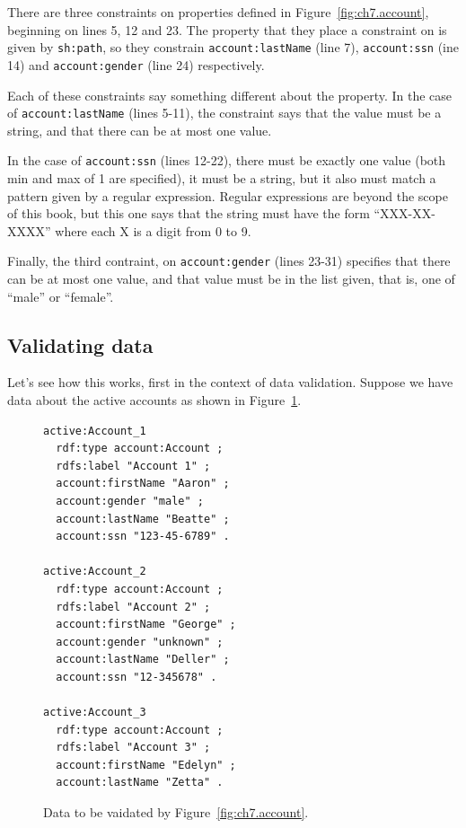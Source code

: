 There are three constraints on properties defined in Figure~\ref{fig:ch7.account}, beginning on lines 5, 12 and 23.  The property that they place a constraint on is given by \texttt{sh:path}, so they constrain \texttt{account:lastName} (line 7), \texttt{account:ssn} (ine 14)  and \texttt{account:gender} (line 24) respectively.

Each of these constraints say something different about the property.  
In the case of \texttt{account:lastName} (lines 5-11), the constraint says 
that the value must be a string,  and that there can be at most one value.

In the case of \texttt{account:ssn} (lines 12-22), there must be exactly one value 
(both min and max of 1 are specified), it must be a string, but it also must match
a pattern given by a regular expression.  Regular expressions are beyond the scope
of this book, but this one says that the string must have the form ``XXX-XX-XXXX''
where each X is a digit from 0 to 9.

Finally, the third contraint, on \texttt{account:gender} (lines 23-31) specifies that
there can be at most one value, and that value must be in the list given, that is, one
of ``male'' or ``female''.

\hypertarget{validating-data}{%
\subsection{Validating data}\label{validating-data}}


Let's see how this works, first in the context
of data validation.  Suppose we have data about the active accounts as shown in
Figure~\ref{fig:ch7.data}.


\begin{figure}
  \begin{lstlisting}
active:Account_1
  rdf:type account:Account ;
  rdfs:label "Account 1" ;
  account:firstName "Aaron" ;
  account:gender "male" ;
  account:lastName "Beatte" ;
  account:ssn "123-45-6789" .

active:Account_2
  rdf:type account:Account ;
  rdfs:label "Account 2" ;
  account:firstName "George" ;
  account:gender "unknown" ;
  account:lastName "Deller" ;
  account:ssn "12-345678" .

active:Account_3
  rdf:type account:Account ;
  rdfs:label "Account 3" ;
  account:firstName "Edelyn" ;
  account:lastName "Zetta" .
  \end{lstlisting}
\label{fig:ch7.data}
\caption{Data to be vaidated by Figure~\protect\ref{fig:ch7.account}.}
\end{figure}

